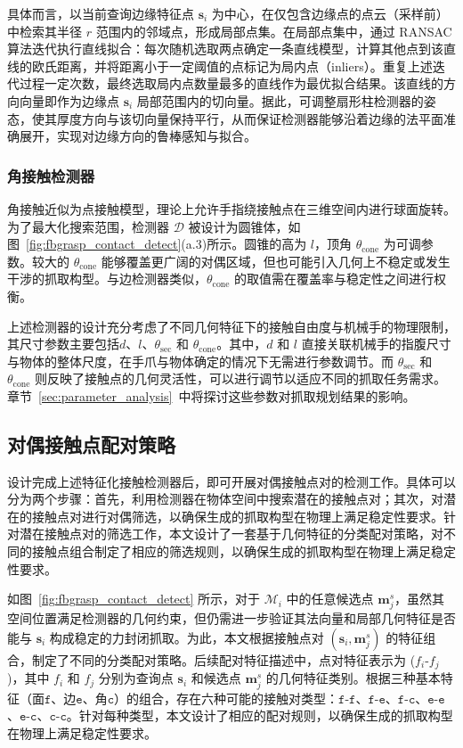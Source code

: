 具体而言，以当前查询边缘特征点 $\mathbf{s}_i$ 为中心，在仅包含边缘点的点云（采样前）中检索其半径 $r$ 范围内的邻域点，形成局部点集。在局部点集中，通过 RANSAC 算法迭代执行直线拟合：每次随机选取两点确定一条直线模型，计算其他点到该直线的欧氏距离，并将距离小于一定阈值的点标记为局内点（inliers）。重复上述迭代过程一定次数，最终选取局内点数量最多的直线作为最优拟合结果。该直线的方向向量即作为边缘点 $\mathbf{s}_i$ 局部范围内的切向量。据此，可调整扇形柱检测器的姿态，使其厚度方向与该切向量保持平行，从而保证检测器能够沿着边缘的法平面准确展开，实现对边缘方向的鲁棒感知与拟合。

\subsubsection{角接触检测器}
角接触近似为点接触模型，理论上允许手指绕接触点在三维空间内进行球面旋转。为了最大化搜索范围，检测器 $\mathcal{D}$ 被设计为圆锥体，如图~\ref{fig:fbgrasp_contact_detect}(a.3)所示。圆锥的高为 $l$，顶角 $\theta_{\mathrm{cone}}$ 为可调参数。较大的 $\theta_{\mathrm{cone}}$ 能够覆盖更广阔的对偶区域，但也可能引入几何上不稳定或发生干涉的抓取构型。与边检测器类似，$\theta_{\mathrm{cone}}$ 的取值需在覆盖率与稳定性之间进行权衡。

上述检测器的设计充分考虑了不同几何特征下的接触自由度与机械手的物理限制，其尺寸参数主要包括$d$、$l$、$\theta_{\mathrm{sec}}$ 和 $\theta_{\mathrm{cone}}$。其中，$d$ 和 $l$ 直接关联机械手的指腹尺寸与物体的整体尺度，在手爪与物体确定的情况下无需进行参数调节。而 $\theta_{\mathrm{sec}}$ 和 $\theta_{\mathrm{cone}}$ 则反映了接触点的几何灵活性，可以进行调节以适应不同的抓取任务需求。章节~\ref{sec:parameter_analysis}~中将探讨这些参数对抓取规划结果的影响。

\subsection{对偶接触点配对策略}
\label{sec:antipodal_pairing}
设计完成上述特征化接触检测器后，即可开展对偶接触点对的检测工作。具体可以分为两个步骤：首先，利用检测器在物体空间中搜索潜在的接触点对；其次，对潜在的接触点对进行对偶筛选，以确保生成的抓取构型在物理上满足稳定性要求。针对潜在接触点对的筛选工作，本文设计了一套基于几何特征的分类配对策略，对不同的接触点组合制定了相应的筛选规则，以确保生成的抓取构型在物理上满足稳定性要求。

如图~\ref{fig:fbgrasp_contact_detect} 所示，对于 $\mathcal{M}_i$ 中的任意候选点 $\mathbf{m}_j^s$，虽然其空间位置满足检测器的几何约束，但仍需进一步验证其法向量和局部几何特征是否能与 $\mathbf{s}_i$ 构成稳定的力封闭抓取。为此，本文根据接触点对 $(\mathbf{s}_i, \mathbf{m}_j^s)$ 的特征组合，制定了不同的分类配对策略。后续配对特征描述中，点对特征表示为 ($f_i$-$f_j$)，其中 $f_i$ 和 $f_j$ 分别为查询点 $\mathbf{s}_i$ 和候选点 $\mathbf{m}_j^s$ 的几何特征类别。根据三种基本特征（面$\mathtt{f}$、边$\mathtt{e}$、角$\mathtt{c}$）的组合，存在六种可能的接触对类型：$\mathtt{f}$-$\mathtt{f}$、$\mathtt{f}$-$\mathtt{e}$、$\mathtt{f}$-$\mathtt{c}$、$\mathtt{e}$-$\mathtt{e}$、$\mathtt{e}$-$\mathtt{c}$、$\mathtt{c}$-$\mathtt{c}$。针对每种类型，本文设计了相应的配对规则，以确保生成的抓取构型在物理上满足稳定性要求。

